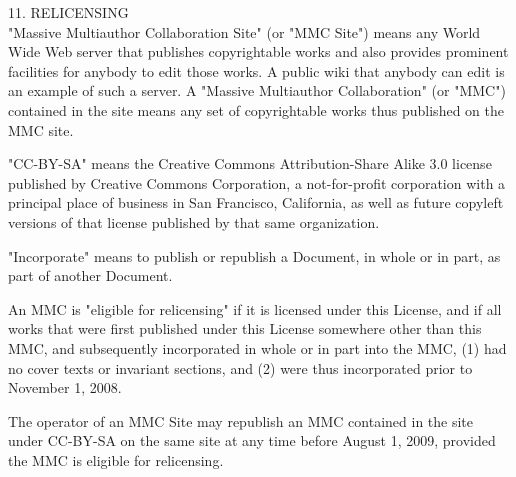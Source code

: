 \documentclass[oneside,12pt]{memoir} %
\begin{document}
11. RELICENSING\\

"Massive Multiauthor Collaboration Site" (or "MMC Site") means any World Wide Web server that publishes copyrightable works and also provides prominent facilities for anybody to edit those works. A public wiki that anybody can edit is an example of such a server. A "Massive Multiauthor Collaboration" (or "MMC") contained in the site means any set of copyrightable works thus published on the MMC site.

"CC-BY-SA" means the Creative Commons Attribution-Share Alike 3.0 license published by Creative Commons Corporation, a not-for-profit corporation with a principal place of business in San Francisco, California, as well as future copyleft versions of that license published by that same organization.

"Incorporate" means to publish or republish a Document, in whole or in part, as part of another Document.

An MMC is "eligible for relicensing" if it is licensed under this License, and if all works that were first published under this License somewhere other than this MMC, and subsequently incorporated in whole or in part into the MMC, (1) had no cover texts or invariant sections, and (2) were thus incorporated prior to November 1, 2008.

The operator of an MMC Site may republish an MMC contained in the site under CC-BY-SA on the same site at any time before August 1, 2009, provided the MMC is eligible for relicensing.
\end{document}
